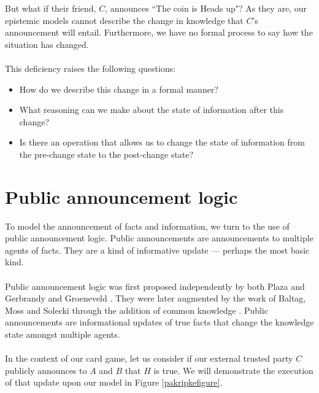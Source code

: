 But what if their friend, $C$, announces ``The coin is Heads up"?
As they are, our epistemic models cannot describe the change in knowledge that
$C$'s announcement will entail.
Furthermore, we have no formal process to say how the situation has changed.\\
\\
This deficiency raises the following questions:
\begin{itemize}
	\item How do we describe this change in a formal manner?
	\item What reasoning can we make about the state of information after this
	change?
	\item Is there an operation that allows us to change the state of information
	from the pre-change state to the post-change state?
\end{itemize}

\section{Public announcement logic}\label{pal}
To model the announcement of facts and information, we turn to the use of public
announcement logic.
Public announcements are announcements to multiple agents of facts.
They are a kind of informative update --- perhaps the most basic kind.\\
\\
Public announcement logic was first proposed independently by both Plaza and
Gerbrandy and Groeneveld \cite{plaza2007public,gelbrandy1997reasoning}.
They were later augmented by the work of Baltag, Moss and Solecki through the
addition of common knowledge \cite{baltag1998lpa}.
Public announcements are informational updates of true facts that change the
knowledge state amongst multiple agents.\\
\\
In the context of our card game, let us consider if our external trusted party
$C$ publicly announces to $A$ and $B$ that $H$ is true.
We will demonstrate the execution of that update upon our model in Figure
\ref{pakripkefigure}.

